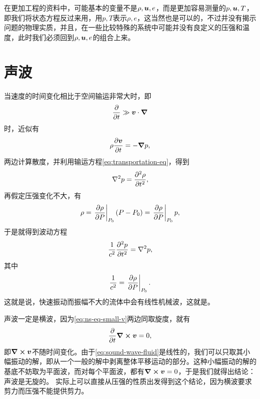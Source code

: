 在更加工程的资料中，可能基本的变量不是$\rho, \vb*{u}, e$，而是更加容易测量的$p, \vb*{u}, T$，即我们将状态方程反过来用，用$p, T$表示$\rho, e$，这当然也是可以的，不过并没有揭示问题的物理实质，并且，在一些比较特殊的系统中可能并没有良定义的压强和温度，此时我们必须回到$\rho, \vb*{u}, e$的组合上来。

\section{声波}

当速度的时间变化相比于空间输运非常大时，即
\[
    \pdv{t} \gg \vb*{v} \cdot \grad
\]
时，近似有
\begin{equation}
    \rho \pdv{\vb*{v}}{t} = - \grad{p},
    \label{eq:ns-eq-small-v}
\end{equation}
两边计算散度，并利用输运方程\eqref{eq:transportation-eq}，得到
\[
    \laplacian{p} = \pdv[2]{\rho}{t},
\]
再假定压强变化不大，有
\[
    \rho = \eval{\pdv{\rho}{P}}_{P_0} (P - P_0) = \eval{\pdv{\rho}{P}}_{P_0} p,
\]
于是就得到波动方程
\begin{equation}
    \frac{1}{c^2} \pdv[2]{p}{t} = \laplacian{p},
    \label{eq:sound-wave-fluid}
\end{equation}
其中
\begin{equation}
    \frac{1}{c^2} = \eval{\pdv{\rho}{P}}_{P_0}.
\end{equation}
这就是说，快速振动而振幅不大的流体中会有线性机械波，这就是。

声波一定是横波，因为\eqref{eq:ns-eq-small-v}两边同取旋度，就有
\[
    \pdv{t} \curl{\vb*{v}} = 0, 
\]
即$\curl{\vb*{v}}$不随时间变化。由于\eqref{eq:sound-wave-fluid}是线性的，我们可以只取其小幅振动的解，即从一个一般的解中剥离整体平移运动的部分。这种小幅振动的解的基底不妨取为平面波，而对每个平面波，都有$\curl{\vb*{v}}=0$，于是我们就得出结论：声波是无旋的。
实际上可以直接从压强的性质出发得到这个结论，因为横波要求剪力而压强不能提供剪力。
